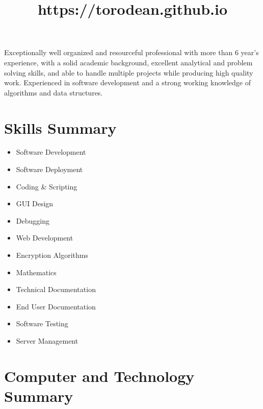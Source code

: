 \documentclass[11pt,a4paper,sans]{moderncv} %
\title{https://torodean.github.io}
\begin{document}
\makecvtitle %


Exceptionally well organized and resourceful professional with more than 6 year’s experience, with a solid academic background, excellent analytical and problem solving skills, and able to handle multiple projects while producing high quality work. Experienced in software development and a strong working knowledge of algorithms and data structures.	


\section{Skills Summary}

\begin{multicols}{3}
	\begin{itemize}
	\item Software Development
	\item Software Deployment
	\item Coding \& Scripting
	\item GUI Design
	\item Debugging
	\item Web Development
	\item Encryption Algorithms
	\item Mathematics
	\item Technical Documentation
	\item End User Documentation
	\item Software Testing
	\item Server Management
	\end{itemize}
\end{multicols}


\section{Computer and Technology Summary}
\end{document}
